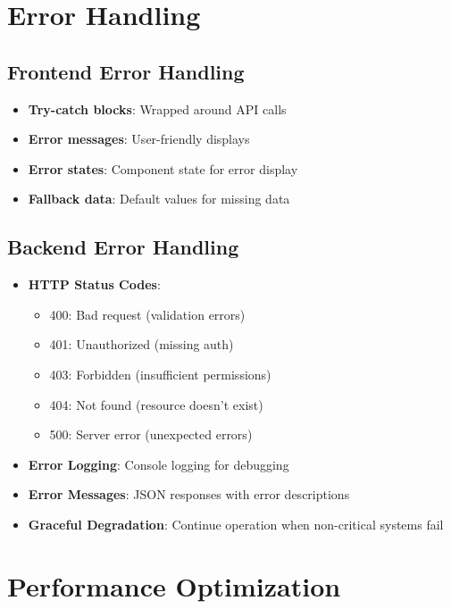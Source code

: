 \documentclass[12pt,a4paper]{report}
\begin{document}
\section{Error Handling}

\subsection{Frontend Error Handling}

\begin{itemize}
    \item \textbf{Try-catch blocks}: Wrapped around API calls
    \item \textbf{Error messages}: User-friendly displays
    \item \textbf{Error states}: Component state for error display
    \item \textbf{Fallback data}: Default values for missing data
\end{itemize}

\subsection{Backend Error Handling}

\begin{itemize}
    \item \textbf{HTTP Status Codes}:
        \begin{itemize}
            \item 400: Bad request (validation errors)
            \item 401: Unauthorized (missing auth)
            \item 403: Forbidden (insufficient permissions)
            \item 404: Not found (resource doesn't exist)
            \item 500: Server error (unexpected errors)
        \end{itemize}
    \item \textbf{Error Logging}: Console logging for debugging
    \item \textbf{Error Messages}: JSON responses with error descriptions
    \item \textbf{Graceful Degradation}: Continue operation when non-critical systems fail
\end{itemize}

\section{Performance Optimization}
\end{document}
